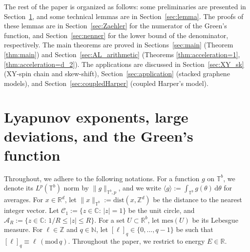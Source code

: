 \documentclass[11pt]{amsart}
\newcommand{\Z}{\mathbb Z}
\newcommand{\R}{\mathbb R}
\newcommand{\C}{\mathbb C}
\newcommand{\T}{\mathbb T}
\newcommand{\N}{\mathbb N}
\def\tor{\mathbb{T}}
\begin{document}
\medskip

The rest of the paper is organized as follows: some preliminaries are presented in Section~\ref{sec:Pre}, and some technical lemmas are in Section~\ref{sec:lemma}. The proofs of these lemmas are in Section~\ref{sec:Zaehler} for the numerator of the Green's function, and Section~\ref{sec:nenner} for the lower bound of the denominator, respectively. 
The main theorems are proved in Sections~\ref{sec:main} (Theorem \ref{thm:main}) and Section~\ref{sec:AL_arithmetic} (Theorems \ref{thm:acceleration=1}, \ref{thm:acceleration=d_2}). 
The applications are discussed in Section~\ref{sec:XY_sk} (XY-spin chain and skew-shift), Section~\ref{sec:application} (stacked graphene models), and Section~\ref{sec:coupledHarper} (coupled Harper's model).



\section{Lyapunov exponents, large deviations, and the Green's function}\label{sec:Pre}

Throughout, we adhere to the following notations. 
For a function $g$ on $\T^b$, we denote its $L^p(\T^b)$ norm by $\|g\|_{\T^b, p}$, and we write $\langle g\rangle:=\int_{\T^b } g(\theta)\, \mathrm{d}\theta$ for averages.
For $x\in \R^d$, let $\|x\|_{\tor^b}:=\mathrm{dist}(x,\Z^d)$ be the distance to the nearest integer vector. 
Let $\mathcal{C}_1:=\{z\in \C:\, |z|=1\}$ be the unit circle, and $\mathcal{A}_R:=\{z\in \C:\, 1/R\leq |z|\leq R\}$.
For a set $U\subset\R^b$, let $\mathrm{mes}(U)$ be its Lebesgue measure.
For $\ell\in \Z$ and $q\in \N$, let $[\ell]_q\in \{0,...,q-1\}$ be such that $[\ell]_q\equiv \ell\, (\mathrm{mod}\,  q)$.
Throughout the paper, we restrict to energy $E\in \R$.
\end{document}
